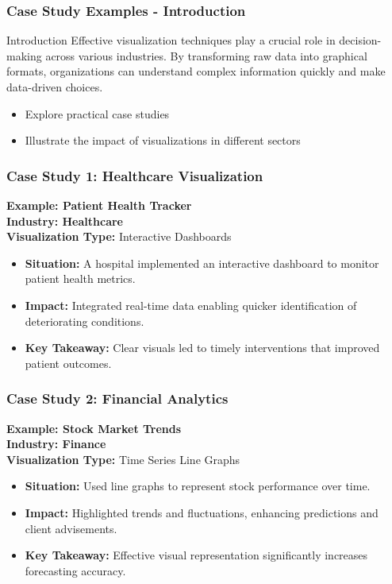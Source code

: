 \documentclass[aspectratio=169]{beamer}
\begin{document}
\begin{frame}[fragile]
    \frametitle{Case Study Examples - Introduction}
    \begin{block}{Introduction}
        Effective visualization techniques play a crucial role in decision-making across various industries. 
        By transforming raw data into graphical formats, organizations can understand complex information quickly and make data-driven choices.
    \end{block}
    \begin{itemize}
        \item Explore practical case studies 
        \item Illustrate the impact of visualizations in different sectors
    \end{itemize}
\end{frame}

\begin{frame}[fragile]
    \frametitle{Case Study 1: Healthcare Visualization}
    \textbf{Example: Patient Health Tracker} \\
    \textbf{Industry: Healthcare} \\
    \textbf{Visualization Type:} Interactive Dashboards
    \begin{itemize}
        \item \textbf{Situation:} A hospital implemented an interactive dashboard to monitor patient health metrics.
        \item \textbf{Impact:} Integrated real-time data enabling quicker identification of deteriorating conditions.
        \item \textbf{Key Takeaway:} Clear visuals led to timely interventions that improved patient outcomes.
    \end{itemize}
\end{frame}

\begin{frame}[fragile]
    \frametitle{Case Study 2: Financial Analytics}
    \textbf{Example: Stock Market Trends} \\
    \textbf{Industry: Finance} \\
    \textbf{Visualization Type:} Time Series Line Graphs
    \begin{itemize}
        \item \textbf{Situation:} Used line graphs to represent stock performance over time.
        \item \textbf{Impact:} Highlighted trends and fluctuations, enhancing predictions and client advisements.
        \item \textbf{Key Takeaway:} Effective visual representation significantly increases forecasting accuracy.
    \end{itemize}
\end{frame}
\end{document}

